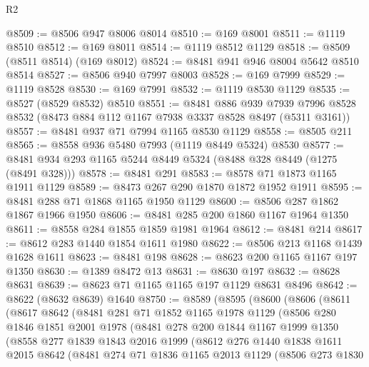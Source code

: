 \begin{lexlean}{R2}
\begin{coremodule}
@8509 := @8506 @947 @8006 @8014
@8510 := @169 @8001
@8511 := @1119 @8510
@8512 := @169 @8011
@8514 := @1119 @8512 @1129
@8518 := @8509 (@8511 @8514) (@169 @8012)
@8524 := @8481 @941 @946 @8004 @5642 @8510 @8514
@8527 := @8506 @940 @7997 @8003
@8528 := @169 @7999
@8529 := @1119 @8528
@8530 := @169 @7991
@8532 := @1119 @8530 @1129
@8535 := @8527 (@8529 @8532) @8510
@8551 := @8481
    @886
    @939
    @7939
    @7996
    @8528
    @8532
    (@8473 @884 @112 @1167 @7938 @3337 @8528 @8497 (@5311 @3161))
@8557 := @8481 @937 @71 @7994 @1165 @8530 @1129
@8558 := @8505 @211
@8565 := @8558 @936 @5480 @7993 (@1119 @8449 @5324) @8530
@8577 := @8481 @934 @293 @1165 @5244 @8449 @5324 (@8488 @328 @8449 (@1275 (@8491 @328)))
@8578 := @8481 @291
@8583 := @8578 @71 @1873 @1165 @1911 @1129
@8589 := @8473 @267 @290 @1870 @1872 @1952 @1911
@8595 := @8481 @288 @71 @1868 @1165 @1950 @1129
@8600 := @8506 @287 @1862 @1867 @1966 @1950
@8606 := @8481 @285 @200 @1860 @1167 @1964 @1350
@8611 := @8558 @284 @1855 @1859 @1981 @1964
@8612 := @8481 @214
@8617 := @8612 @283 @1440 @1854 @1611 @1980
@8622 := @8506 @213 @1168 @1439 @1628 @1611
@8623 := @8481 @198
@8628 := @8623 @200 @1165 @1167 @197 @1350
@8630 := @1389 @8472 @13
@8631 := @8630 @197
@8632 := @8628 @8631
@8639 := @8623 @71 @1165 @1165 @197 @1129 @8631 @8496
@8642 := @8622 (@8632 @8639) @1640
@8750 := @8589
    (@8595
      (@8600
        (@8606
          (@8611
            (@8617
              @8642
              (@8481
                @281
                @71
                @1852
                @1165
                @1978
                @1129
                (@8506
                  @280
                  @1846
                  @1851
                  @2001
                  @1978
                  (@8481
                    @278
                    @200
                    @1844
                    @1167
                    @1999
                    @1350
                    (@8558
                      @277
                      @1839
                      @1843
                      @2016
                      @1999
                      (@8612
                        @276
                        @1440
                        @1838
                        @1611
                        @2015
                        @8642
                        (@8481
                          @274
                          @71
                          @1836
                          @1165
                          @2013
                          @1129
                          (@8506
                            @273
                            @1830

\end{coremodule}
\end{lexlean}
